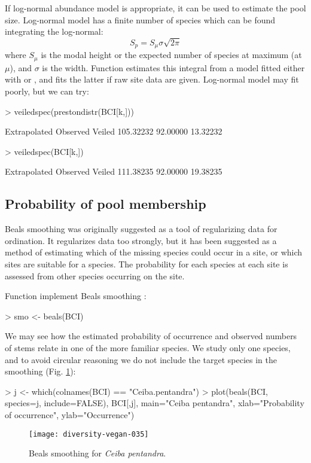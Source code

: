 \documentclass[a4paper,10pt,twocolumn]{article}
\begin{document}
If log-normal abundance model is appropriate, it can be used to
estimate the pool size.  Log-normal model has a finite number of
species which can be found integrating the log-normal:
\begin{equation}
S_p = S_\mu \sigma \sqrt{2 \pi}
\end{equation}
where $S_\mu$ is the modal height or the expected number of species at
maximum (at $\mu$), and $\sigma$ is the width.  Function
 estimates this integral from a model fitted either
with  or , and fits the latter
if raw site data are given.  Log-normal model may fit poorly, but we
can try:
\begin{Schunk}
\begin{Sinput}
> veiledspec(prestondistr(BCI[k,]))
\end{Sinput}
\begin{Soutput}
Extrapolated     Observed       Veiled 
   105.32232     92.00000     13.32232 
\end{Soutput}
\begin{Sinput}
> veiledspec(BCI[k,])
\end{Sinput}
\begin{Soutput}
Extrapolated     Observed       Veiled 
   111.38235     92.00000     19.38235 
\end{Soutput}
\end{Schunk}

\subsection{Probability of pool membership}

Beals smoothing was originally suggested as a tool of regularizing data
for ordination.  It regularizes data too strongly,
but it has been suggested as a method of estimating which of the
missing species could occur in a site, or which sites are suitable for
a species.  The probability for each species at each site is assessed
from other species occurring on the site.

Function  implement Beals smoothing \citep{McCune87,
  DeCaceresLegendre08}:
\begin{Schunk}
\begin{Sinput}
> smo <- beals(BCI)
\end{Sinput}
\end{Schunk}
We may see how the estimated probability of occurrence and observed
numbers of stems relate in one of the more familiar species. We study
only one species, and to avoid circular reasoning we do not include
the target species in the smoothing (Fig. \ref{fig:beals}):
\begin{Schunk}
\begin{Sinput}
> j <- which(colnames(BCI) == "Ceiba.pentandra")
> plot(beals(BCI, species=j, include=FALSE), BCI[,j], 
       main="Ceiba pentandra", xlab="Probability of occurrence",
       ylab="Occurrence")
\end{Sinput}
\end{Schunk}
\begin{figure}
\texttt{[image: diversity-vegan-035]}
\caption{Beals smoothing for \emph{Ceiba pentandra}.}
\label{fig:beals}
\end{figure}


\end{document}
